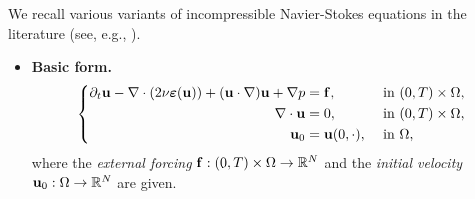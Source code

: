 \documentclass[oneside,11pt]{book}
\numberwithin{equation}{section}
\begin{document}
We recall various variants of incompressible Navier-Stokes equations in the literature (see, e.g., \cite[Subsect. 2.6.4]{Rebollo_Lewandowski2014}).
\begin{itemize}
    \item \textbf{Basic form.}
    \begin{equation}
        \label{incompressible instationary NSEs: basic form}
        \left\{\begin{split}
            \partial_t{\bf u} - \nabla\cdot(2\nu\boldsymbol{\varepsilon}({\bf u})) + ({\bf u}\cdot\nabla){\bf u} + \nabla p &= {\bf f},&&\mbox{ in }(0,T)\times\Omega,\\
            \nabla\cdot{\bf u} &= 0,&&\mbox{ in }(0,T)\times\Omega,\\
            {\bf u}_0 &= {\bf u}(0,\cdot),&&\mbox{ in }\Omega,
        \end{split}\right.
    \end{equation}
    where the \textit{external forcing} ${\bf f}:(0,T)\times\Omega\to\mathbb{R}^N$ and the \textit{initial velocity} ${\bf u}_0:\Omega\to\mathbb{R}^N$ are given.
    

\end{itemize}
\end{document}
